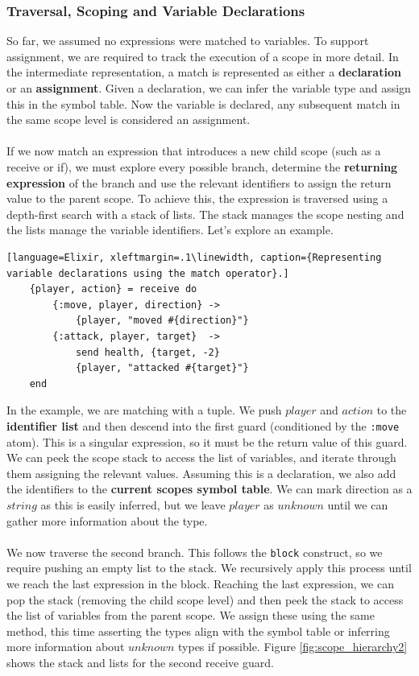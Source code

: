 \subsubsection{Traversal, Scoping and Variable Declarations}
So far, we assumed no expressions were matched to variables. To support assignment, we are required to track the execution of a scope in more detail. In the intermediate representation, a match is represented as either a \textbf{declaration} or an \textbf{assignment}. Given a declaration, we can infer the variable type and assign this in the symbol table. Now the variable is declared, any subsequent match in the same scope level is considered an assignment.
\\ \\
If we now match an expression that introduces a new child scope (such as a receive or if), we must explore every possible branch, determine the \textbf{returning expression} of the branch and use the relevant identifiers to assign the return value to the parent scope. To achieve this, the expression is traversed using a depth-first search with a stack of lists. The stack manages the scope nesting and the lists manage the variable identifiers. Let's explore an example.
\begin{lstlisting}[language=Elixir, xleftmargin=.1\linewidth, caption={Representing variable declarations using the match operator}.]
    {player, action} = receive do
        {:move, player, direction} -> 
            {player, "moved #{direction}"}
        {:attack, player, target}  -> 
            send health, {target, -2}
            {player, "attacked #{target}"}
    end
\end{lstlisting}
In the example, we are matching with a tuple. We push $player$ and $action$ to the \textbf{identifier list} and then descend into the first guard (conditioned by the \texttt{:move} atom). This is a singular expression, so it must be the return value of this guard. We can peek the scope stack to access the list of variables, and iterate through them assigning the relevant values. Assuming this is a declaration, we also add the identifiers to the \textbf{current scopes symbol table}. We can mark direction as a $string$ as this is easily inferred, but we leave $player$ as $unknown$ until we can gather more information about the type. 
\\ \\
We now traverse the second branch. This follows the \texttt{block} construct, so we require pushing an empty list to the stack. We recursively apply this process until we reach the last expression in the block. Reaching the last expression, we can pop the stack (removing the child scope level) and then peek the stack to access the list of variables from the parent scope. We assign these using the same method, this time asserting the types align with the symbol table or inferring more information about $unknown$ types if possible. Figure \ref{fig:scope_hierarchy2} shows the stack and lists for the second receive guard.\\ \\
